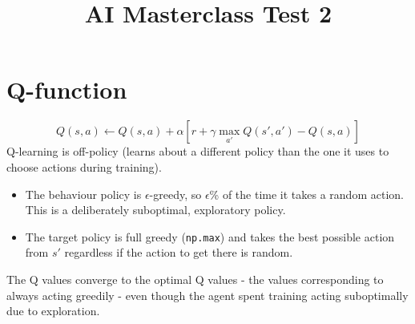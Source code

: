 \documentclass[12pt, a4paper]{article}
\title{AI Masterclass Test 2}
\author{}
\date{}
\begin{document}
\section{Q-function}

$$Q(s, a) \leftarrow Q(s, a) + \alpha [ r + \gamma \max_{a'} Q(s', a') - Q(s, a) ]$$
Q-learning is off-policy (learns about a different policy than the one it uses to choose actions during training).
\begin{itemize}
    \item The behaviour policy is $\epsilon$-greedy, so $\epsilon$\% of the time it takes a random action. This is a deliberately suboptimal, exploratory policy.
    \item The target policy is full greedy (\texttt{np.max}) and takes the best possible action from $s'$ regardless if the action to get there is random.
\end{itemize}
The Q values converge to the optimal Q values - the values corresponding to always acting greedily - even though the agent spent training acting suboptimally due to exploration.
\end{document}
